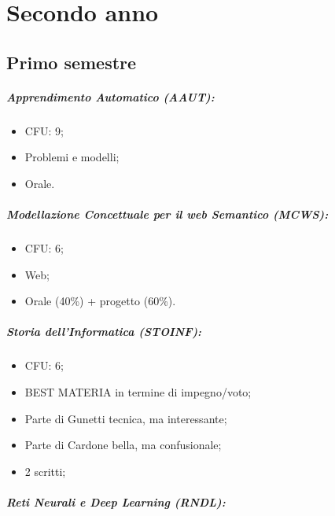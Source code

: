 \chapter{Secondo anno}

\section{Primo semestre}

\paragraph{Apprendimento Automatico (AAUT):}

\begin{itemize}
  \item CFU: 9;
  \item Problemi e modelli;
  \item Orale.
\end{itemize}

\paragraph{Modellazione Concettuale per il web Semantico (MCWS):}

\begin{itemize}
  \item CFU: 6;
  \item Web;
  \item Orale (40\%) + progetto (60\%).
\end{itemize}

\paragraph{Storia dell'Informatica (STOINF):}

\begin{itemize}
  \item CFU: 6;
  \item BEST MATERIA in termine di impegno/voto;
  \item Parte di Gunetti tecnica, ma interessante;
  \item Parte di Cardone bella, ma confusionale; 
  \item 2 scritti;
\end{itemize}

\paragraph{Reti Neurali e Deep Learning (RNDL):}

